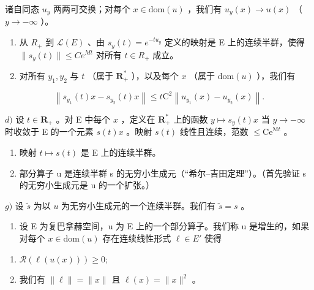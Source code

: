 诸自同态 \(u_{y}\) 两两可交换；对每个 \(x \in \text{dom}(u)\) ，我们有 \(u_{y}(x) \to u(x)\) （\(y \to -\infty\) ）。

\begin{enumerate}
\def\labelenumi{\alph{enumi})}
\setcounter{enumi}{1}
\item
  从 \(R_{+}\) 到 \(\mathcal{L}(E)\) 、由 \(s_{y}(t)=e^{-tu_{y}}\) 定义的映射是 E 上的连续半群，使得 \(\|s_{y}(t)\|\leqslant Ce^{Mt}\) 对所有 \(t\in R_{+}\) 成立。
\item
  对所有 \(y_{1}, y_{2}\) 与 \(t\) （属于 \(\mathbf{R}_{+}^{*}\) ），以及每个 \(x\) （属于 \(\mathrm{dom}(u)\) ），我们有
\end{enumerate}

\[
\left\| s _ {y _ {1}} (t) x - s _ {y _ {2}} (t) x \right\| \leqslant t \mathrm{C} ^ {2} \left\| u _ {y _ {1}} (x) - u _ {y _ {2}} (x) \right\|.
\]

\(d)\) 设 \(t \in \mathbf{R}_{+}\) 。对 E 中每个 \(x\) ，定义在 \(\mathbf{R}_{+}^{*}\) 上的函数 \(y \mapsto s_{y}(t)x\) 当 \(y \to -\infty\) 时收敛于 E 的一个元素 \(s(t)x\) 。映射 \(s(t)\) 线性且连续，范数 \(\leqslant \mathrm{Ce}^{\mathrm{M}t}\) 。

\begin{enumerate}
\def\labelenumi{\alph{enumi})}
\setcounter{enumi}{4}
\item
  映射 \(t \mapsto s(t)\) 是 E 上的连续半群。
\item
  部分算子 u 是连续半群 s 的无穷小生成元（“希尔–吉田定理”）。（首先验证 s 的无穷小生成元是 u 的一个扩张。）
\end{enumerate}

\(g)\) 设 \(\widetilde{s}\) 为以 \(u\) 为无穷小生成元的一个连续半群。我们有 \(\widetilde{s} = s\) 。

\begin{enumerate}
\def\labelenumi{\arabic{enumi})}
\setcounter{enumi}{6}
\tightlist
\item
  设 E 为复巴拿赫空间，u 为 E 上的一个部分算子。我们称 u 是增生的，如果对每个 \(x \in \text{dom}(u)\) 存在连续线性形式 \(\ell \in E'\) 使得
\end{enumerate}

\begin{enumerate}
\def\labelenumi{(\roman{enumi})}
\item
  \(\mathcal{R}(\ell(u(x))) \geqslant 0;\)
\item
  我们有 \(\|\ell\|=\|x\|\) 且 \(\ell(x)=\|x\|^{2}\) 。
\end{enumerate}

